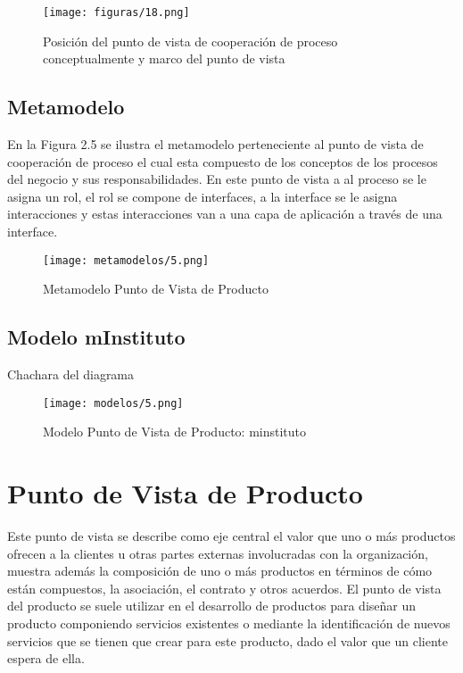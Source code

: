   \begin{figure}[!h]
  	\centering
  	\texttt{[image: figuras/18.png]}
  	\captionsetup{width=.95\textwidth}
  	\caption{Posición del punto de vista de cooperación de proceso conceptualmente y marco del punto de vista}
  	\label{figura18}
  \end{figure}
  
  \subsection{Metamodelo}
  En la Figura 2.5 se ilustra el metamodelo perteneciente al punto de vista de cooperación de proceso el cual esta compuesto de los conceptos de los procesos del negocio y sus responsabilidades. En este punto de vista a al proceso se le asigna un rol, el rol se compone de interfaces, a la interface se le asigna interacciones y estas interacciones van a una capa de aplicación a través de una interface.
  
  \begin{figure}[!h]
  	\centering
  	\texttt{[image: metamodelos/5.png]}
  	\captionsetup{width=.95\textwidth}
  	\caption{Metamodelo Punto de Vista de Producto}
  	\label{metamodelo5}
  \end{figure}
  
  \subsection{Modelo mInstituto}Chachara del diagrama
  \begin{figure}[!h]
  	\centering
  	\texttt{[image: modelos/5.png]}
  	\captionsetup{width=.95\textwidth}
  	\caption{Modelo Punto de Vista de Producto: minstituto}
  	\label{modelo5}
  \end{figure}
  
\section{Punto de Vista de Producto}
Este punto de vista se describe como eje central el valor que uno o más productos ofrecen a la clientes u otras partes externas involucradas con la organización, muestra además la composición de uno o más productos en términos de cómo están compuestos, la asociación, el contrato y otros acuerdos. El punto de vista del producto se suele utilizar en el desarrollo de productos para diseñar un producto componiendo servicios existentes o mediante la identificación de nuevos servicios que se tienen que crear para este producto, dado el valor que un cliente espera de ella.

